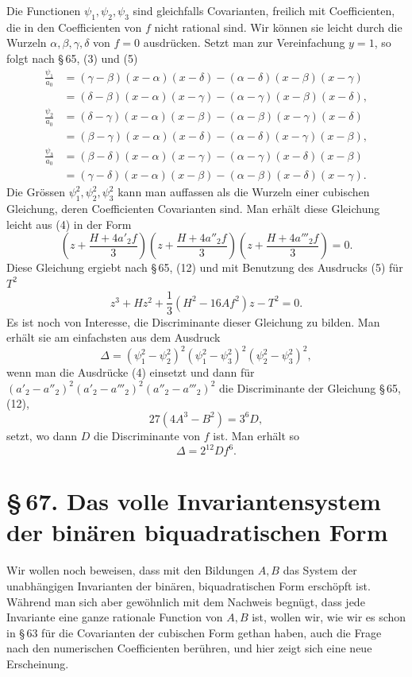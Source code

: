 \documentclass[11pt]{article}
\providecommand{\sect}[2]{\section*{\S\,#1. #2}}
\begin{document}
Die Functionen $\psi_1,\psi_2,\psi_3$ sind gleichfalls Covarianten, freilich mit Coefficienten, die in den Coefficienten von $f$ nicht rational sind. Wir können sie leicht durch die Wurzeln $\alpha,\beta,\gamma,\delta$ von $f=0$ ausdrücken. Setzt man zur Vereinfachung $y=1$, so folgt nach \S\,65, (3) und (5)
\[
\begin{aligned}
\frac{\psi_1}{a_0}&=(\gamma-\beta)(x-\alpha)(x-\delta)-(\alpha-\delta)(x-\beta)(x-\gamma)\\
&=(\delta-\beta)(x-\alpha)(x-\gamma)-(\alpha-\gamma)(x-\beta)(x-\delta),\\[0.3em]
\frac{\psi_2}{a_0}&=(\delta-\gamma)(x-\alpha)(x-\beta)-(\alpha-\beta)(x-\gamma)(x-\delta)\\
&=(\beta-\gamma)(x-\alpha)(x-\delta)-(\alpha-\delta)(x-\gamma)(x-\beta),\\[0.3em]
\frac{\psi_3}{a_0}&=(\beta-\delta)(x-\alpha)(x-\gamma)-(\alpha-\gamma)(x-\delta)(x-\beta)\\
&=(\gamma-\delta)(x-\alpha)(x-\beta)-(\alpha-\beta)(x-\delta)(x-\gamma).
\end{aligned}
\tag{6}
\]
Die Grössen $\psi_1^2,\psi_2^2,\psi_3^2$ kann man auffassen als die Wurzeln einer cubischen Gleichung, deren Coefficienten Covarianten sind. Man erhält diese Gleichung leicht aus (4) in der Form
\[
 \left(z+\frac{H+4a'_2f}{3}\right)
 \left(z+\frac{H+4a''_2f}{3}\right)
 \left(z+\frac{H+4a'''_2f}{3}\right)=0.
\]
Diese Gleichung ergiebt nach \S\,65, (12) und mit Benutzung des Ausdrucks (5) für $T^2$
\begin{equation}
 z^3+Hz^2+\frac13(H^2-16Af^2)z-T^2=0.
\tag{7}
\end{equation}
Es ist noch von Interesse, die Discriminante dieser Gleichung zu bilden. Man erhält sie am einfachsten aus dem Ausdruck
\[
 \Delta=(\psi_1^2-\psi_2^2)^2(\psi_1^2-\psi_3^2)^2(\psi_2^2-\psi_3^2)^2,
\]
wenn man die Ausdrücke (4) einsetzt und dann für $(a'_2-a''_2)^2(a'_2-a'''_2)^2(a''_2-a'''_2)^2$ die Discriminante der Gleichung \S\,65, (12),
\[
 27(4A^3-B^2)=3^6D,
\]
setzt, wo dann $D$ die Discriminante von $f$ ist. Man erhält so
\begin{equation}
 \Delta=2^{12}Df^6.
\tag{8}
\end{equation}

\sect{67}{Das volle Invariantensystem der binären biquadratischen Form}

Wir wollen noch beweisen, dass mit den Bildungen $A,B$ das System der unabhängigen Invarianten der binären, biquadratischen Form erschöpft ist. Während man sich aber gewöhnlich mit dem Nachweis begnügt, dass jede Invariante eine ganze rationale Function von $A,B$ ist, wollen wir, wie wir es schon in \S\,63 für die Covarianten der cubischen Form gethan haben, auch die Frage nach den numerischen Coefficienten berühren, und hier zeigt sich eine neue Erscheinung.
\end{document}
